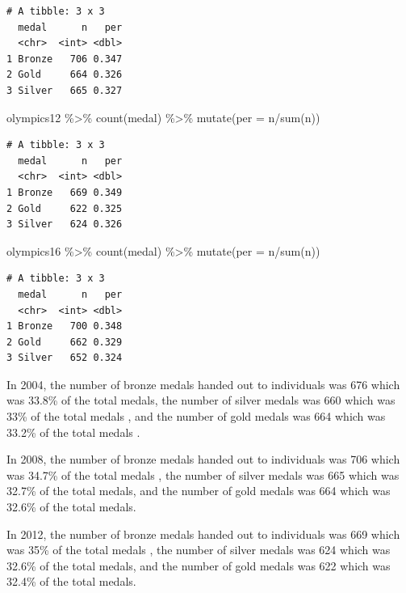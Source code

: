\documentclass[
  letterpaper,
  DIV=11,
  numbers=noendperiod]{scrartcl}
\newenvironment{Shaded}{\begin{snugshade}}{\end{snugshade}}
\newcommand{\AttributeTok}[1]{\textcolor[rgb]{0.40,0.45,0.13}{#1}}
\newcommand{\FunctionTok}[1]{\textcolor[rgb]{0.28,0.35,0.67}{#1}}
\newcommand{\NormalTok}[1]{\textcolor[rgb]{0.00,0.23,0.31}{#1}}
\newcommand{\SpecialCharTok}[1]{\textcolor[rgb]{0.37,0.37,0.37}{#1}}
\begin{document}
\begin{verbatim}
# A tibble: 3 x 3
  medal      n   per
  <chr>  <int> <dbl>
1 Bronze   706 0.347
2 Gold     664 0.326
3 Silver   665 0.327
\end{verbatim}

\begin{Shaded}
\begin{Highlighting}[]
\NormalTok{olympics12 }\SpecialCharTok{\%\textgreater{}\%}
  \FunctionTok{count}\NormalTok{(medal) }\SpecialCharTok{\%\textgreater{}\%}
  \FunctionTok{mutate}\NormalTok{(}\AttributeTok{per =}\NormalTok{ n}\SpecialCharTok{/}\FunctionTok{sum}\NormalTok{(n))}
\end{Highlighting}
\end{Shaded}

\begin{verbatim}
# A tibble: 3 x 3
  medal      n   per
  <chr>  <int> <dbl>
1 Bronze   669 0.349
2 Gold     622 0.325
3 Silver   624 0.326
\end{verbatim}

\begin{Shaded}
\begin{Highlighting}[]
\NormalTok{olympics16 }\SpecialCharTok{\%\textgreater{}\%}
  \FunctionTok{count}\NormalTok{(medal) }\SpecialCharTok{\%\textgreater{}\%}
  \FunctionTok{mutate}\NormalTok{(}\AttributeTok{per =}\NormalTok{ n}\SpecialCharTok{/}\FunctionTok{sum}\NormalTok{(n))}
\end{Highlighting}
\end{Shaded}

\begin{verbatim}
# A tibble: 3 x 3
  medal      n   per
  <chr>  <int> <dbl>
1 Bronze   700 0.348
2 Gold     662 0.329
3 Silver   652 0.324
\end{verbatim}

In 2004, the number of bronze medals handed out to individuals was 676
which was 33.8\% of the total medals, the number of silver medals was
660 which was 33\% of the total medals , and the number of gold medals
was 664 which was 33.2\% of the total medals .

In 2008, the number of bronze medals handed out to individuals was 706
which was 34.7\% of the total medals , the number of silver medals was
665 which was 32.7\% of the total medals, and the number of gold medals
was 664 which was 32.6\% of the total medals.

In 2012, the number of bronze medals handed out to individuals was 669
which was 35\% of the total medals , the number of silver medals was 624
which was 32.6\% of the total medals, and the number of gold medals was
622 which was 32.4\% of the total medals.
\end{document}
